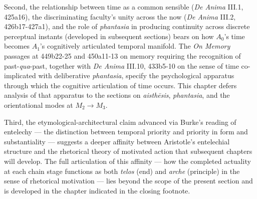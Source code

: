 \documentclass[12pt]{article}
\begin{document}
{Second, the relationship between time as a common sensible (\textit{De Anima} III.1, 425a16), the discriminating faculty's unity across the now (\textit{De Anima} III.2, 426b17-427a1), and the role of \textit{phantasia} in producing continuity across discrete perceptual instants (developed in subsequent sections) bears on how $A_0$'s time becomes $A_1$'s cognitively articulated temporal manifold. The \textit{On Memory} passages at 449b22-25 and 450a11-13 on memory requiring the recognition of past-\textit{qua}-past, together with \textit{De Anima} III.10, 433b5-10 on the sense of time co-implicated with deliberative \textit{phantasia}, specify the psychological apparatus through which the cognitive articulation of time occurs. This chapter defers analysis of that apparatus to the sections on \textit{aisthēsis}, \textit{phantasia}, and the orientational modes at $M_2$$\to$$M_3$.

Third, the etymological-architectural claim advanced via Burke's reading of entelechy --- the distinction between temporal priority and priority in form and substantiality --- suggests a deeper affinity between Aristotle's entelechial structure and the rhetorical theory of motivated action that subsequent chapters will develop. The full articulation of this affinity --- how the completed actuality at each chain stage functions as both \textit{telos} (end) and \textit{arche} (principle) in the sense of rhetorical motivation --- lies beyond the scope of the present section and is developed in the chapter indicated in the closing footnote.}
\end{document}
